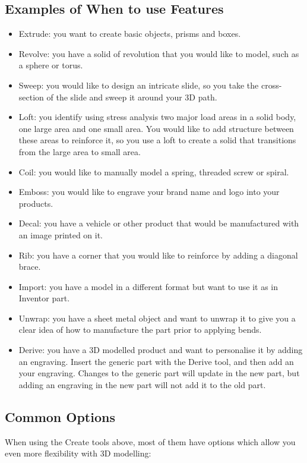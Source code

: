 \subsection{Examples of When to use Features}
\begin{itemize}
    \item Extrude: you want to create basic objects, prisms and boxes.
    \item Revolve: you have a solid of revolution that you would like to model, such as a sphere or torus.
    \item Sweep: you would like to design an intricate slide, so you take the cross-section of the slide and sweep it around your 3D path.
    \item Loft: you identify using stress analysis two major load areas in a solid body, one large area and one small area. You would like to add structure between these areas to reinforce it, so you use a loft to create a solid that transitions from the large area to small area.
    \item Coil: you would like to manually model a spring, threaded screw or spiral.
    \item Emboss: you would like to engrave your brand name and logo into your products.
    \item Decal: you have a vehicle or other product that would be manufactured with an image printed on it.
    \item Rib: you have a corner that you would like to reinforce by adding a diagonal brace.
    \item Import: you have a model in a different format but want to use it as in Inventor part.
    \item Unwrap: you have a sheet metal object and want to unwrap it to give you a clear idea of how to manufacture the part prior to applying bends.
    \item Derive: you have a 3D modelled product and want to personalise it by adding an engraving. Insert the generic part with the Derive tool, and then add an your engraving. Changes to the generic part will update in the new part, but adding an engraving in the new part will not add it to the old part.
\end{itemize}

\subsection{Common Options}
When using the Create tools above, most of them have options which allow you even more flexibility with 3D modelling:


